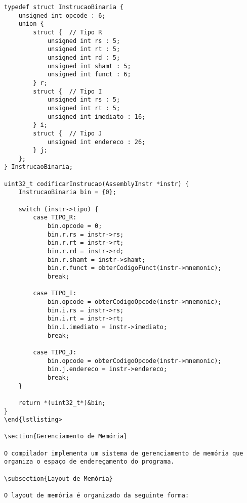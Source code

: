 \documentclass[
	12pt,				%
	oneside,
	a4paper,			%
	english,			%
	french,				%
	spanish,			%
	brazil,				%
	]{abntex2}
\begin{document}
\begin{lstlisting}[style=cstyle, caption=Codificação binária das instruções]
typedef struct InstrucaoBinaria {
    unsigned int opcode : 6;
    union {
        struct {  // Tipo R
            unsigned int rs : 5;
            unsigned int rt : 5;
            unsigned int rd : 5;
            unsigned int shamt : 5;
            unsigned int funct : 6;
        } r;
        struct {  // Tipo I
            unsigned int rs : 5;
            unsigned int rt : 5;
            unsigned int imediato : 16;
        } i;
        struct {  // Tipo J
            unsigned int endereco : 26;
        } j;
    };
} InstrucaoBinaria;

uint32_t codificarInstrucao(AssemblyInstr *instr) {
    InstrucaoBinaria bin = {0};
    
    switch (instr->tipo) {
        case TIPO_R:
            bin.opcode = 0;
            bin.r.rs = instr->rs;
            bin.r.rt = instr->rt;
            bin.r.rd = instr->rd;
            bin.r.shamt = instr->shamt;
            bin.r.funct = obterCodigoFunct(instr->mnemonic);
            break;
            
        case TIPO_I:
            bin.opcode = obterCodigoOpcode(instr->mnemonic);
            bin.i.rs = instr->rs;
            bin.i.rt = instr->rt;
            bin.i.imediato = instr->imediato;
            break;
            
        case TIPO_J:
            bin.opcode = obterCodigoOpcode(instr->mnemonic);
            bin.j.endereco = instr->endereco;
            break;
    }
    
    return *(uint32_t*)&bin;
}
\end{lstlisting>

\section{Gerenciamento de Memória}

O compilador implementa um sistema de gerenciamento de memória que organiza o espaço de endereçamento do programa.

\subsection{Layout de Memória}

O layout de memória é organizado da seguinte forma:


\end{lstlisting}
\end{document}

